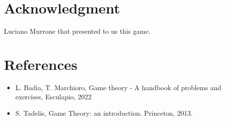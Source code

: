 \documentclass[conference]{IEEEtran}
\begin{document}
\section*{Acknowledgment}
Luciano Murrone that presented to us this game.

\section*{References}
\begin{itemize}
    \item L. Badia, T. Marchioro, Game theory - A handbook of problems and exercises, Esculapio, 2022
    \item S. Tadelis, Game Theory: an introduction. Princeton, 2013.
\end{itemize}
\end{document}
